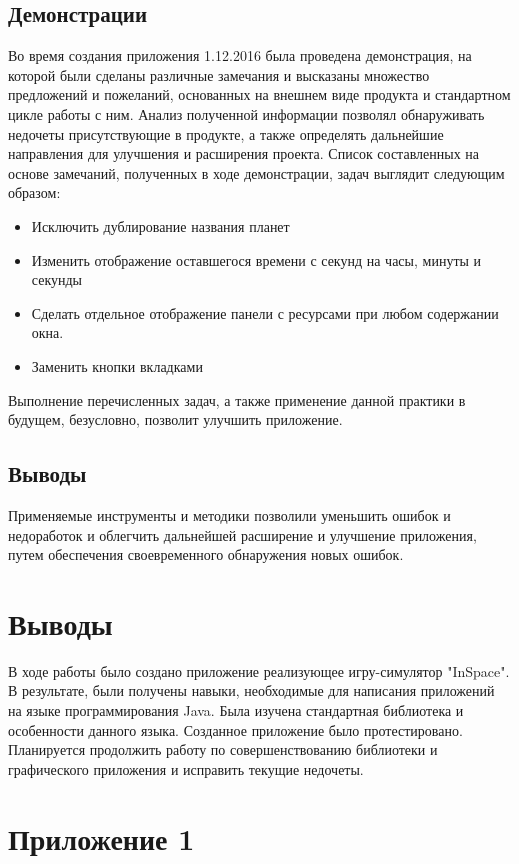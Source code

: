 \subsection{Демонстрации}

Во время создания приложения 1.12.2016 была проведена демонстрация, на которой были сделаны различные замечания и высказаны множество предложений и пожеланий, основанных на внешнем виде продукта и стандартном цикле работы с ним. Анализ полученной информации позволял обнаруживать недочеты присутствующие в продукте, а также определять дальнейшие направления для улучшения и расширения проекта. Список составленных на основе замечаний, полученных в ходе демонстрации, задач выглядит следующим образом:
\begin{itemize}
\item Исключить дублирование названия планет
\item Изменить отображение оставшегося времени с секунд на часы, минуты и секунды
\item Сделать отдельное отображение панели с ресурсами при любом содержании окна.
\item Заменить кнопки вкладками
\end{itemize}

Выполнение перечисленных задач, а также применение данной практики в будущем, безусловно, позволит улучшить приложение.

\subsection{Выводы}
Применяемые инструменты и методики позволили уменьшить ошибок и недоработок и облегчить дальнейшей расширение и улучшение приложения, путем обеспечения своевременного обнаружения новых ошибок. 

\section{Выводы}
В ходе работы было создано приложение реализующее игру-симулятор "InSpace". В результате, были получены навыки, необходимые для написания приложений на языке программирования Java. Была изучена стандартная библиотека и особенности данного языка.
Созданное приложение было протестировано. 
Планируется продолжить работу по совершенствованию библиотеки и графического приложения и исправить текущие недочеты.

\section{Приложение 1}
\label{sec:listings}

